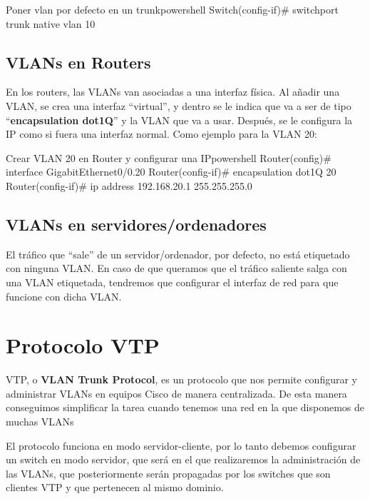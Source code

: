 \begin{mycode}{Poner vlan por defecto en un trunk}{powershell}{}
Switch(config-if)# switchport trunk native vlan 10
\end{mycode}


\subsection{VLANs en Routers}
En los routers, las VLANs van asociadas a una interfaz física. Al añadir una VLAN, se crea una interfaz “virtual”, y dentro se le indica que va a ser de tipo “\textbf{encapsulation dot1Q}” y la VLAN que va a usar. Después, se le configura la IP como si fuera una interfaz normal. Como ejemplo para la VLAN 20:

\begin{mycode}{Crear VLAN 20 en Router y configurar una IP}{powershell}{}
Router(config)# interface GigabitEthernet0/0.20
Router(config-if)# encapsulation dot1Q 20
Router(config-if)# ip address 192.168.20.1 255.255.255.0
\end{mycode}




\subsection{VLANs en servidores/ordenadores}
El tráfico que “sale” de un servidor/ordenador, por defecto, no está etiquetado con ninguna VLAN. En caso de que queramos que el tráfico saliente salga con una VLAN etiquetada, tendremos que configurar el interfaz de red para que funcione con dicha VLAN.



\section{Protocolo VTP}
VTP, o \textbf{VLAN Trunk Protocol}, es un protocolo que nos permite configurar y administrar VLANs en equipos Cisco de manera centralizada. De esta manera conseguimos simplificar la tarea cuando tenemos una red en la que disponemos de muchas VLANs

El protocolo funciona en modo  servidor-cliente, por lo tanto debemos configurar un switch en modo servidor, que será en el que realizaremos la administración de las VLANs, que posteriormente serán propagadas por los switches que son clientes VTP y que pertenecen al mismo dominio.



